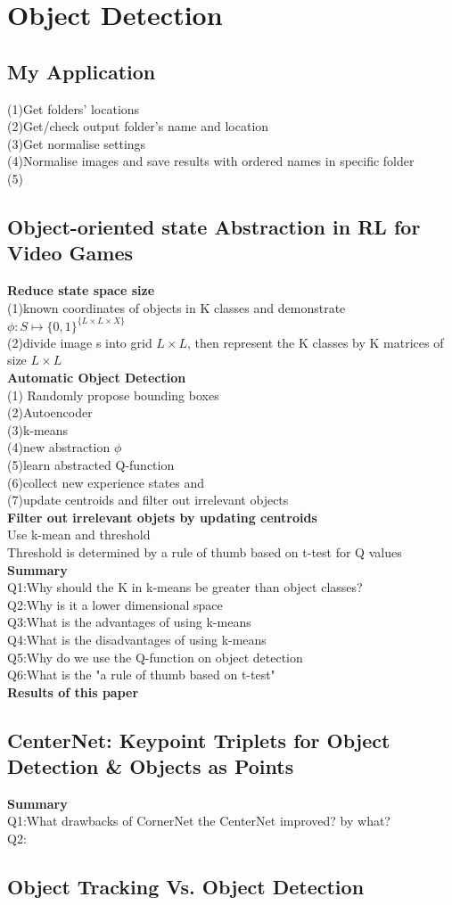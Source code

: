 \chapter{Object Detection}
\label{cha:intro}
\section{My Application}
(1)Get folders' locations\\
(2)Get/check output folder's name and location\\
(3)Get normalise settings\\
(4)Normalise images and save results with ordered names in specific folder\\
(5)
\section{Object-oriented state Abstraction in RL for Video Games}
\textbf{Reduce state space size}\\
(1)known coordinates of objects in K classes and demonstrate $\phi :S\mapsto \{0,1\} ^{\{L\times L\times X\}}$\\
(2)divide image s into grid $L\times L$, then represent the K classes by K matrices of size $L\times L$\\
\textbf{Automatic Object Detection}\\
(1) Randomly propose bounding boxes\\
(2)Autoencoder\\
(3)k-means\\
(4)new abstraction $\phi$\\
(5)learn abstracted Q-function\\
(6)collect new experience states and\\
(7)update centroids and filter out irrelevant objects\\
\textbf{Filter out irrelevant objets by updating centroids}\\
Use k-mean and threshold\\
Threshold is determined by a rule of thumb based on t-test for Q values
\textbf{Summary}\\
Q1:Why should the K in k-means be greater than object classes?\\
Q2:Why is it a lower dimensional space\\
Q3:What is the advantages of using k-means\\
Q4:What is the disadvantages of using k-means\\
Q5:Why do we use the Q-function on object detection\\
Q6:What is the "a rule of thumb based on t-test"\\
\textbf{Results of this paper}\\

\section{CenterNet: Keypoint Triplets for Object Detection & Objects as Points}
\textbf{Summary}\\
Q1:What drawbacks of CornerNet the CenterNet improved? by what?\\
Q2:

\section{Object Tracking Vs. Object Detection}
